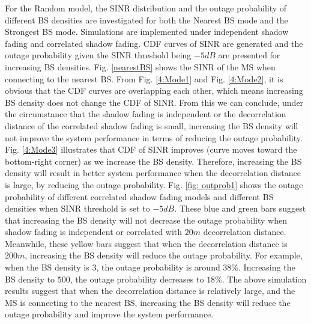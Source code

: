\documentclass[journal,10pt]{IEEEtran}
\begin{document}
 \par For the Random model, the SINR distribution and the outage probability of different BS densities are investigated for both the Nearest BS mode and the Strongest BS mode. Simulations are implemented under independent shadow fading and correlated shadow fading. CDF curves of SINR are generated and the outage probability given the SINR threshold being $-5dB$ are presented for increasing BS densities. Fig. \ref{nearestBS} shows the SINR of the MS when connecting to the nearest BS. From Fig. \ref{4:Mode1} and Fig. \ref{4:Mode2}, it is obvious that the CDF curves are overlapping each other, which means increasing BS density does not change the CDF of SINR. From this we can conclude, under the circumstance that the shadow fading is independent or the decorrelation distance of the correlated shadow fading is small, increasing the BS density will not improve the system performance in terms of reducing the outage probability. Fig. \ref{4:Mode3}  illustrates that CDF of SINR improves (curve moves toward the bottom-right corner) as we increase the BS density. Therefore, increasing the BS density will result in better system performance when the decorrelation distance is large, by reducing the outage probability. Fig. \ref{fig: outprob1} shows the outage probability of different correlated shadow fading models and different BS densities when SINR threshold is set to $-5dB$. These blue and green bars suggest that increasing the BS density will not decrease the outage probability when shadow fading is independent or correlated with $20m$ decorrelation distance. Meanwhile, these yellow bars suggest that when the decorrelation distance is $200m$, increasing the BS density will reduce the outage probability. For example, when the BS density is $3$, the outage probability is around $38\%$. Increasing the BS density to $500$, the outage probability decreases to $18\%$. The above simulation results suggest that when the decorrelation distance is relatively large, and the MS is connecting to the nearest BS, increasing the BS density will reduce the outage probability and improve the system performance.
\end{document}
